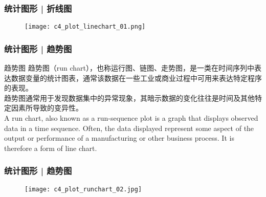 \begin{frame}
  \frametitle{统计图形 | 折线图}
  \begin{figure}
    \centering
    \texttt{[image: c4\_plot\_linechart\_01.png]}
  \end{figure}
\end{frame}

\begin{frame}
  \frametitle{统计图形 | 趋势图}
  \begin{block}{趋势图}
    趋势图（run chart），也称运行图、链图、走势图，是一类在时间序列中表达数据变量的统计图表，通常该数据在一些工业或商业过程中可用来表达特定程序的表现。\\
    \vspace{0.5em}
    趋势图通常用于发现数据集中的异常现象，其暗示数据的变化往往是时间及其他特定因素所导致的变异性。\\
    \vspace{0.5em}
    A run chart, also known as a run-sequence plot is a graph that displays observed data in a time sequence. Often, the data displayed represent some aspect of the output or performance of a manufacturing or other business process. It is therefore a form of line chart.
  \end{block}
\end{frame}


\begin{frame}
  \frametitle{统计图形 | 趋势图}
  \begin{figure}
    \centering
    \texttt{[image: c4\_plot\_runchart\_02.jpg]}
  \end{figure}
\end{frame}

